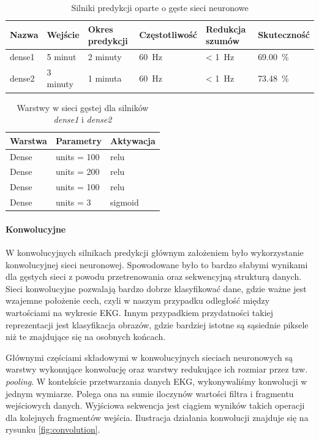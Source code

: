 \documentclass[polish,12pt]{aghthesis}
\begin{document}
\begin{table}[h]
	\centering
\begin{tabular}{l|lllll}
	Nazwa & Wejście & Okres predykcji & Częstotliwość & Redukcja szumów & Skuteczność \\ \hline
	dense1 & 5 minut & 2 minuty & \SI{60}{\hertz} & < \SI{1}{\hertz} & \SI{69,00}{\percent} \\
	dense2 & 3 minuty & 1 minuta & \SI{60}{\hertz} & < \SI{1}{\hertz} & \SI{73,48}{\percent}
\end{tabular}
\caption{Silniki predykcji oparte o gęste sieci neuronowe}
\label{tab:dense_engines}
\end{table}

\begin{table}[h]
	\centering
\begin{tabular}{l|ll}
	Warstwa      & Parametry             & Aktywacja \\ \hline
	Dense        & units = 100           & relu         \\
	Dense        & units = 200           & relu         \\
	Dense        & units = 100           & relu         \\
	Dense        & units = 3             & sigmoid
\end{tabular}
\caption{Warstwy w sieci gęstej dla silników \emph{dense1} i \emph{dense2}}
\label{tab:dense1}
\end{table}

\paragraph{Konwolucyjne}

W konwolucyjnych silnikach predykcji głównym założeniem było wykorzystanie konwolucyjnej sieci neuronowej. Spowodowane było to bardzo słabymi wynikami dla gęstych sieci z powodu przetrenowania oraz sekwencyjną strukturą danych. Sieci konwolucyjne pozwalają bardzo dobrze klasyfikować dane, gdzie ważne jest wzajemne położenie cech, czyli w naszym przypadku odległość między wartościami na wykresie EKG. Innym przypadkiem przydatności takiej reprezentacji jest klasyfikacja obrazów, gdzie bardziej istotne są sąsiednie piksele niż te znajdujące się na osobnych końcach.

Głównymi częściami składowymi w konwolucyjnych sieciach neuronowych są warstwy wykonujące konwolucję oraz warstwy redukujące ich rozmiar przez tzw. \emph{pooling}. W kontekście przetwarzania danych EKG, wykonywaliśmy konwolucji w jednym wymiarze. Polega ona na sumie iloczynów wartości filtra i fragmentu wejściowych danych. Wyjściowa sekwencja jest ciągiem wyników takich operacji dla kolejnych fragmentów wejścia. Ilustracja działania konwolucji znajduje się na rysunku \ref{fig:convolution}.
\end{document}
